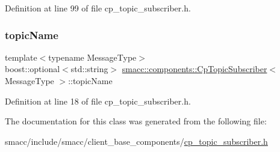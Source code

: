 Definition at line 99 of file cp\+\_\+topic\+\_\+subscriber.\+h.

\mbox{\label{classsmacc_1_1components_1_1CpTopicSubscriber_a90e61b81d9bb33b886162eb41051fe1c}} 
\subsubsection{\texorpdfstring{topic\+Name}{topicName}}
{\footnotesize\ttfamily template$<$typename Message\+Type$>$ \\
boost\+::optional$<$std\+::string$>$ \hyperlink{classsmacc_1_1components_1_1CpTopicSubscriber}{smacc\+::components\+::\+Cp\+Topic\+Subscriber}$<$ Message\+Type $>$\+::topic\+Name}



Definition at line 18 of file cp\+\_\+topic\+\_\+subscriber.\+h.



The documentation for this class was generated from the following file\+:\begin{DoxyCompactItemize}
\item 
smacc/include/smacc/client\+\_\+base\+\_\+components/\hyperlink{cp__topic__subscriber_8h}{cp\+\_\+topic\+\_\+subscriber.\+h}\end{DoxyCompactItemize}
